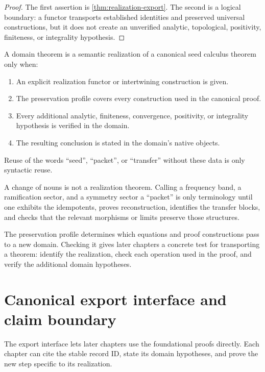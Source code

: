 \begin{proof}
The first assertion is \cref{thm:realization-export}.  The second is a logical boundary: a functor transports established identities and preserved universal constructions, but it does not create an unverified analytic, topological, positivity, finiteness, or integrality hypothesis.
\end{proof}

\begin{definition}
\label{def:semantic-realization}
A domain theorem is a semantic realization of a canonical seed calculus theorem only when:
\begin{enumerate}[label=(\roman*)]
\item An explicit realization functor or intertwining construction is given.
\item The preservation profile covers every construction used in the canonical proof.
\item Every additional analytic, finiteness, convergence, positivity, or integrality hypothesis is verified in the domain.
\item The resulting conclusion is stated in the domain's native objects.
\end{enumerate}
Reuse of the words ``seed'', ``packet'', or ``transfer'' without these data is only syntactic reuse.
\end{definition}

\begin{warningbox}
A change of nouns is not a realization theorem.  Calling a frequency band, a ramification sector, and a symmetry sector a ``packet'' is only terminology until one exhibits the idempotents, proves reconstruction, identifies the transfer blocks, and checks that the relevant morphisms or limits preserve those structures.
\end{warningbox}

\begin{sectionrecap}
The preservation profile determines which equations and proof constructions pass to a new domain.  Checking it gives later chapters a concrete test for transporting a theorem: identify the realization, check each operation used in the proof, and verify the additional domain hypotheses.
\end{sectionrecap}


\section{Canonical export interface and claim boundary}
\begin{readerroadmap}
The export interface lets later chapters use the foundational proofs directly.  Each chapter can cite the stable record ID, state its domain hypotheses, and prove the new step specific to its realization.
\end{readerroadmap}

